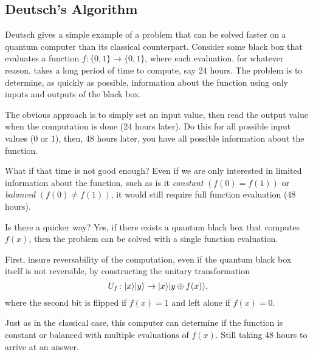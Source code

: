 \subsection{Deutsch's Algorithm}

Deutsch\cite{Deutsch:85a,Deutsch:85b} gives a simple example of a problem that
can be solved faster on a quantum computer than its classical
counterpart.
Consider some black box that evaluates a function 
$f\colon\lbrace 0,1\rbrace\to\lbrace 0,1\rbrace$,
where each evaluation, for whatever reason, 
takes a long period of time to compute, say 24 hours.
The problem is to determine, as quickly as possible, 
information about the function
using only inputs and outputs of the black box.

The obvious approach is to simply set an input value,
then read the output value when the computation is done
(24 hours later).  Do this for all possible input values
($0$ or $1$), then, 48 hours later, you have all possible 
information about the function.

What if that time is not good enough?  Even if we are only 
interested in limited information about the function, 
such as is it \emph{constant} $\left( f(0) = f(1) \right)$ or
\emph{balanced} $\left( f(0) \ne f(1) \right)$, it would still
require full function evaluation (48 hours).

Is there a quicker way?  Yes, if there exists a quantum
black box that computes $f(x)$, then the problem can be solved
with a single function evaluation.  

First, insure reversability of the computation, even if the 
quantum black box itself is
not reversible, by constructing the unitary transformation
\begin{equation}
U_f\colon {|{x}\rangle}{|{y}\rangle} \to {|{x}\rangle}{|{y\oplus f(x)}\rangle},
\end{equation}
where the second bit is flipped if $f(x)=1$ and left alone
if $f(x)=0$.

Just as in the classical case, this computer can determine
if the function is constant or balanced with multiple evaluations
of $f(x)$.  Still taking 48 hours to arrive at an answer.


